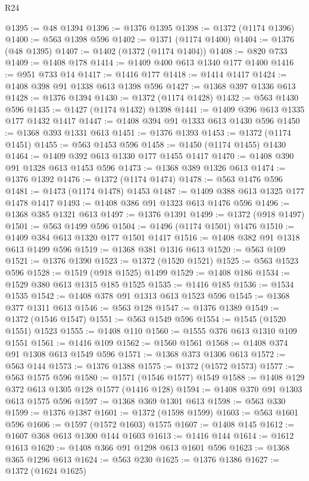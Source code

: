 \begin{lexlean}{R24}
\begin{coremodule}
@1395 := @48 @1394
@1396 := @1376 @1395
@1398 := @1372 (@1174 @1396)
@1400 := @563 @1398 @596
@1402 := @1371 (@1174 @1400)
@1404 := @1376 (@48 @1395)
@1407 := @1402 (@1372 (@1174 @1404))
@1408 := @820 @733
@1409 := @1408 @178
@1414 := @1409 @400 @613 @1340 @177 @1400
@1416 := @951 @733 @14
@1417 := @1416 @177
@1418 := @1414 @1417
@1424 := @1408 @398 @91 @1338 @613 @1398 @596
@1427 := @1368 @397 @1336 @613
@1428 := @1376 @1394
@1430 := @1372 (@1174 @1428)
@1432 := @563 @1430 @596
@1435 := @1427 (@1174 @1432) @1398
@1441 := @1409 @396 @613 @1335 @177 @1432 @1417
@1447 := @1408 @394 @91 @1333 @613 @1430 @596
@1450 := @1368 @393 @1331 @613
@1451 := @1376 @1393
@1453 := @1372 (@1174 @1451)
@1455 := @563 @1453 @596
@1458 := @1450 (@1174 @1455) @1430
@1464 := @1409 @392 @613 @1330 @177 @1455 @1417
@1470 := @1408 @390 @91 @1328 @613 @1453 @596
@1473 := @1368 @389 @1326 @613
@1474 := @1376 @1392
@1476 := @1372 (@1174 @1474)
@1478 := @563 @1476 @596
@1481 := @1473 (@1174 @1478) @1453
@1487 := @1409 @388 @613 @1325 @177 @1478 @1417
@1493 := @1408 @386 @91 @1323 @613 @1476 @596
@1496 := @1368 @385 @1321 @613
@1497 := @1376 @1391
@1499 := @1372 (@918 @1497)
@1501 := @563 @1499 @596
@1504 := @1496 (@1174 @1501) @1476
@1510 := @1409 @384 @613 @1320 @177 @1501 @1417
@1516 := @1408 @382 @91 @1318 @613 @1499 @596
@1519 := @1368 @381 @1316 @613
@1520 := @563 @109
@1521 := @1376 @1390
@1523 := @1372 (@1520 @1521)
@1525 := @563 @1523 @596
@1528 := @1519 (@918 @1525) @1499
@1529 := @1408 @186
@1534 := @1529 @380 @613 @1315 @185 @1525
@1535 := @1416 @185
@1536 := @1534 @1535
@1542 := @1408 @378 @91 @1313 @613 @1523 @596
@1545 := @1368 @377 @1311 @613
@1546 := @563 @128
@1547 := @1376 @1389
@1549 := @1372 (@1546 @1547)
@1551 := @563 @1549 @596
@1554 := @1545 (@1520 @1551) @1523
@1555 := @1408 @110
@1560 := @1555 @376 @613 @1310 @109 @1551
@1561 := @1416 @109
@1562 := @1560 @1561
@1568 := @1408 @374 @91 @1308 @613 @1549 @596
@1571 := @1368 @373 @1306 @613
@1572 := @563 @144
@1573 := @1376 @1388
@1575 := @1372 (@1572 @1573)
@1577 := @563 @1575 @596
@1580 := @1571 (@1546 @1577) @1549
@1588 := @1408 @129 @372 @613 @1305 @128 @1577 (@1416 @128)
@1594 := @1408 @370 @91 @1303 @613 @1575 @596
@1597 := @1368 @369 @1301 @613
@1598 := @563 @330
@1599 := @1376 @1387
@1601 := @1372 (@1598 @1599)
@1603 := @563 @1601 @596
@1606 := @1597 (@1572 @1603) @1575
@1607 := @1408 @145
@1612 := @1607 @368 @613 @1300 @144 @1603
@1613 := @1416 @144
@1614 := @1612 @1613
@1620 := @1408 @366 @91 @1298 @613 @1601 @596
@1623 := @1368 @365 @1296 @613
@1624 := @563 @230
@1625 := @1376 @1386
@1627 := @1372 (@1624 @1625)

\end{coremodule}
\end{lexlean}
